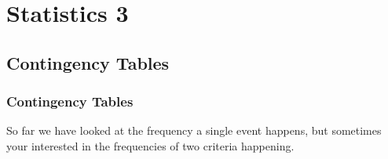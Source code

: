 \chapter*{Statistics 3}

\newpage
\section{Contingency Tables}

    \newpage
    \subsection{Contingency Tables}
        So far we have looked at the frequency a single event happens, but sometimes your interested in the frequencies of two criteria happening.
        
